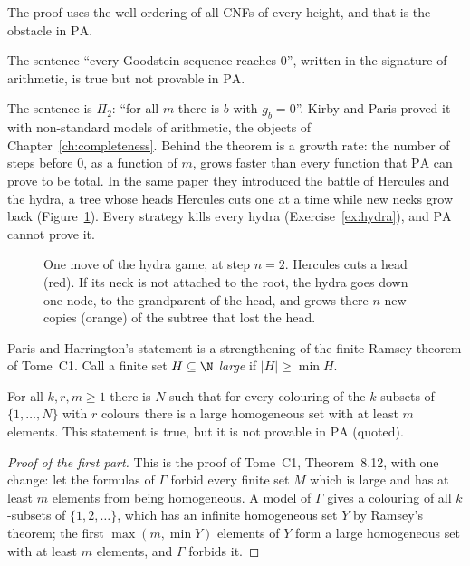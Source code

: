The proof uses the well-ordering of all CNFs of every height, and that is the obstacle in $\mathrm{PA}$.

\begin{theorem}\label{thm:kirbyparis}
The sentence ``every Goodstein sequence reaches $0$'', written in the signature of arithmetic, is true but not provable in $\mathrm{PA}$.
\end{theorem}

The sentence is $\Pi_2$: ``for all $m$ there is $b$ with $g_b=0$''. Kirby and Paris proved it with non-standard models of arithmetic, the objects of Chapter~\ref{ch:completeness}. Behind the theorem is a growth rate: the number of steps before $0$, as a function of $m$, grows faster than every function that $\mathrm{PA}$ can prove to be total. In the same paper they introduced the battle of Hercules and the hydra, a tree whose heads Hercules cuts one at a time while new necks grow back (Figure~\ref{fig:hydra}). Every strategy kills every hydra (Exercise~\ref{ex:hydra}), and $\mathrm{PA}$ cannot prove it.

\begin{figure}[ht]
\centering
{}
\caption{One move of the hydra game, at step $n=2$. Hercules cuts a head (red). If its neck is not attached to the root, the hydra goes down one node, to the grandparent of the head, and grows there $n$ new copies (orange) of the subtree that lost the head.}
\label{fig:hydra}
\end{figure}

Paris and Harrington's statement is a strengthening of the finite Ramsey theorem of Tome~C1. Call a finite set $H\subseteq\N$ \emph{large} if $|H|\ge\min H$.

\begin{theorem}\label{thm:parisharrington}
For all $k,r,m\ge1$ there is $N$ such that for every colouring of the $k$-subsets of $\{1,\dots,N\}$ with $r$ colours there is a large homogeneous set with at least $m$ elements. This statement is true, but it is not provable in $\mathrm{PA}$ (quoted).
\end{theorem}

\begin{proof}[Proof of the first part]
This is the proof of Tome~C1, Theorem~8.12, with one change: let the formulas of $\Gamma$ forbid every finite set $M$ which is large and has at least $m$ elements from being homogeneous. A model of $\Gamma$ gives a colouring of all $k$-subsets of $\{1,2,\dots\}$, which has an infinite homogeneous set $Y$ by Ramsey's theorem; the first $\max(m,\min Y)$ elements of $Y$ form a large homogeneous set with at least $m$ elements, and $\Gamma$ forbids it.
\end{proof}


